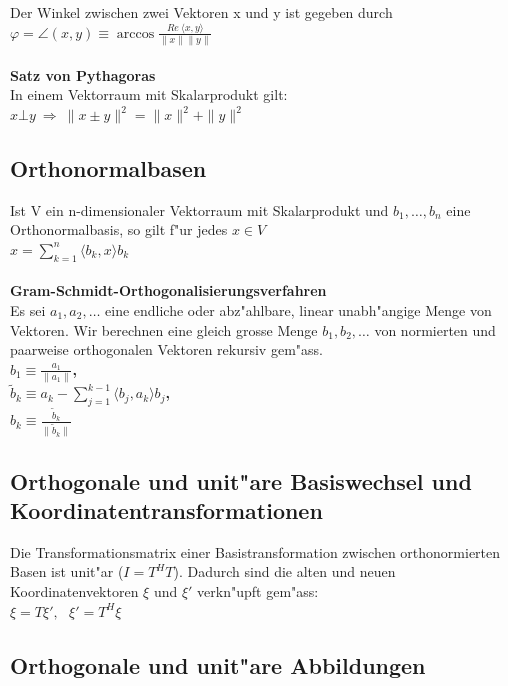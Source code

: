 \documentclass[10pt, a4paper, twocolumn]{scrartcl}
\begin{document}
Der Winkel zwischen zwei Vektoren x und y ist gegeben durch\\
$\varphi =\angle(x,y)\equiv \arccos\frac{Re\:\langle x,y \rangle}{\|x\|\|y\|}$\\\\


{\bf Satz von Pythagoras}\\
In einem Vektorraum mit Skalarprodukt gilt:\\
$x\bot y \:\Rightarrow\:\|x\pm y\|^2=\|x\|^2+\|y\|^2$

\subsection{Orthonormalbasen}

Ist V ein n-dimensionaler Vektorraum mit Skalarprodukt und ${b_1,\ldots,b_n}$ eine Orthonormalbasis, so gilt f"ur jedes $x \in V$\\
$x=\sum^n_{k=1}\langle b_k,x \rangle b_k$\\\\

{\bf Gram-Schmidt-Orthogonalisierungsverfahren}\\
Es sei ${a_1,a_2,\ldots}$ eine endliche oder abz"ahlbare, linear unabh"angige Menge von Vektoren. Wir berechnen eine gleich grosse Menge ${b_1,b_2,\ldots}$ von normierten und paarweise orthogonalen Vektoren rekursiv gem"ass.\\
{\bf
$b_1 \equiv\frac{a_1}{\|a_1\|}$,\\
$\widetilde{b}_k\equiv a_k - \sum^{k-1}_{j=1}\langle b_j, a_k \rangle b_j$,\\
$b_k\equiv\frac{\widetilde{b}_k}{\|\widetilde{b}_k\|}$
}

\subsection{Orthogonale und unit"are Basiswechsel und Koordinatentransformationen}

Die Transformationsmatrix einer Basistransformation zwischen orthonormierten Basen ist unit"ar ($I=T^H T$). Dadurch sind die alten und neuen Koordinatenvektoren $\xi$ und $\xi'$ verkn"upft gem"ass:\\
$\xi=T\xi',\:\:\:\xi'=T^H\xi$

\subsection{Orthogonale und unit"are Abbildungen}
\end{document}

